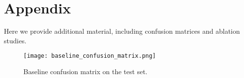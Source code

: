 \documentclass{article}
\begin{document}


\appendix
\section{Appendix}
\label{sec:appendix_figures}
Here we provide additional material, including confusion matrices and ablation studies. 
\begin{figure}[h]
\centering
\texttt{[image: baseline\_confusion\_matrix.png]}
\caption{Baseline confusion matrix on the test set.}
\label{fig:confusion_matrix_baseline}
\end{figure}
\end{document}

